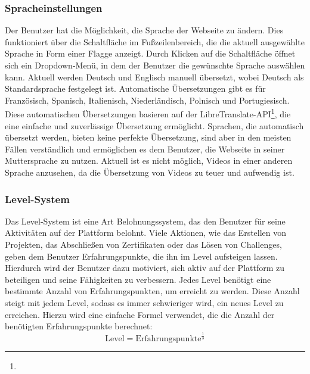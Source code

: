\documentclass[main.tex]{subfiles}
\begin{document}
    \subsubsection{Spracheinstellungen}
    Der Benutzer hat die Möglichkeit, die Sprache der Webseite zu ändern.
    Dies funktioniert über die Schaltfläche im Fußzeilenbereich, die die aktuell ausgewählte Sprache in Form einer Flagge anzeigt.
    Durch Klicken auf die Schaltfläche öffnet sich ein Dropdown-Menü, in dem der Benutzer die gewünschte Sprache auswählen kann.
    Aktuell werden Deutsch und Englisch manuell übersetzt, wobei Deutsch als Standardsprache festgelegt ist.
    Automatische Übersetzungen gibt es für Französisch, Spanisch, Italienisch, Niederländisch, Polnisch und Portugiesisch.
    Diese automatischen Übersetzungen basieren auf der LibreTranslate-API\footnote{}, die eine einfache und zuverlässige Übersetzung ermöglicht.
    Sprachen, die automatisch übersetzt werden, bieten keine perfekte Übersetzung, sind aber in den meisten Fällen verständlich und ermöglichen es dem Benutzer, die Webseite in seiner Muttersprache zu nutzen.
    Aktuell ist es nicht möglich, Videos in einer anderen Sprache anzusehen, da die Übersetzung von Videos zu teuer und aufwendig ist.
    \subsubsection{Level-System}
    Das Level-System ist eine Art Belohnungssystem, das den Benutzer für seine Aktivitäten auf der Plattform belohnt.
    Viele Aktionen, wie das Erstellen von Projekten, das Abschließen von Zertifikaten oder das Lösen von Challenges, geben dem Benutzer Erfahrungspunkte, die ihn im Level aufsteigen lassen.
    Hierdurch wird der Benutzer dazu motiviert, sich aktiv auf der Plattform zu beteiligen und seine Fähigkeiten zu verbessern.
    Jedes Level benötigt eine bestimmte Anzahl von Erfahrungspunkten, um erreicht zu werden.
    Diese Anzahl steigt mit jedem Level, sodass es immer schwieriger wird, ein neues Level zu erreichen.
    Hierzu wird eine einfache Formel verwendet, die die Anzahl der benötigten Erfahrungspunkte berechnet:
    \begin{equation}
        \text{Level} = \text{Erfahrungspunkte}^{\frac{1}{3}}
    \end{equation}
\end{document}
